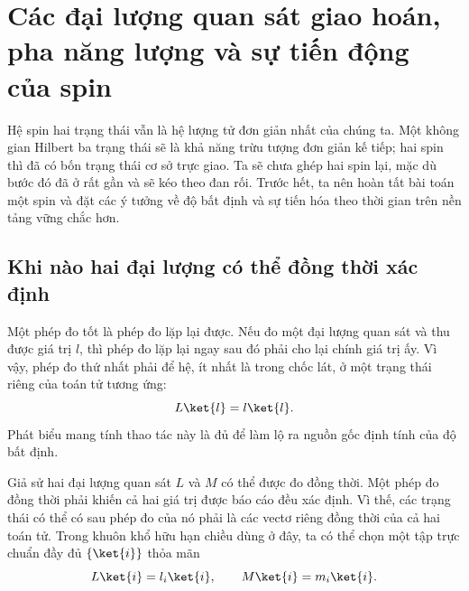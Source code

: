 \chapter{Các đại lượng quan sát giao hoán, pha năng lượng và sự tiến động của spin}


Hệ spin hai trạng thái vẫn là hệ lượng tử đơn giản nhất của chúng ta. Một không gian Hilbert ba trạng thái sẽ là khả năng trừu tượng đơn giản kế tiếp; hai spin thì đã có bốn trạng thái cơ sở trực giao. Ta sẽ chưa ghép hai spin lại, mặc dù bước đó đã ở rất gần và sẽ kéo theo đan rối. Trước hết, ta nên hoàn tất bài toán một spin và đặt các ý tưởng về độ bất định và sự tiến hóa theo thời gian trên nền tảng vững chắc hơn.

\section{Khi nào hai đại lượng có thể đồng thời xác định}

Một phép đo tốt là phép đo lặp lại được. Nếu đo một đại lượng quan sát và thu được giá trị \(l\), thì phép đo lặp lại ngay sau đó phải cho lại chính giá trị ấy. Vì vậy, phép đo thứ nhất phải để hệ, ít nhất là trong chốc lát, ở một trạng thái riêng của toán tử tương ứng:
\begin{equation}
L\ket{l}=l\ket{l}.
\end{equation}
Phát biểu mang tính thao tác này là đủ để làm lộ ra nguồn gốc định tính của độ bất định.

Giả sử hai đại lượng quan sát \(L\) và \(M\) có thể được đo đồng thời. Một phép đo đồng thời phải khiến cả hai giá trị được báo cáo đều xác định. Vì thế, các trạng thái có thể có sau phép đo của nó phải là các vectơ riêng đồng thời của cả hai toán tử. Trong khuôn khổ hữu hạn chiều dùng ở đây, ta có thể chọn một tập trực chuẩn đầy đủ \(\{\ket{i}\}\) thỏa mãn
\begin{equation}
L\ket{i}=l_i\ket{i},
\qquad
M\ket{i}=m_i\ket{i}.
\label{eq:l5-common-eigenvectors}
\end{equation}

